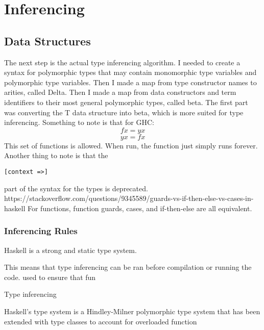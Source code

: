 \chapter{Inferencing}
\section{Data Structures}
The next step is the actual type inferencing algorithm.
	I needed to create a syntax for polymorphic types that may contain monomorphic type variables and polymorphic type variables.
	Then I made a map from type constructor names to arities, called Delta.
	Then I made a map from data constructors and term identifiers to their most general polymorphic types, called beta.
	The first part was converting the T data structure into beta, which is more suited for type inferencing.
	Something to note is that for GHC:
	$$
f x = y x
$$
$$
y x = f x
$$
This set of functions is allowed. When run, the function just simply runs forever.
	Another thing to note is that the
\begin{lstlisting}
[context =>]
\end{lstlisting}
part of the syntax for the types is deprecated.
https://stackoverflow.com/questions/9345589/guards-vs-if-then-else-vs-cases-in-haskell
For functions, function guards, cases, and if-then-else are all equivalent.

\subsection{Inferencing Rules}

\begin{prooftree}
\end{prooftree}

Haskell is a strong and static type system.

This means that type inferencing can be ran before compilation or running the code. used to ensure that fun

Type inferencing 

Haskell's type system is a Hindley-Milner polymorphic type system that has been extended with type classes to account for overloaded function

